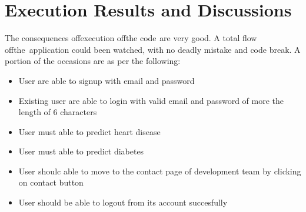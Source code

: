 \documentclass[oneside,12pt]{Classes/VTU}
\begin{document}
	\section{Execution Results and Discussions}
	The consequences of\tiny\textcolor{white}{f}\normalsize execution\tiny\textcolor{white}{f}\normalsize of\tiny\textcolor{white}{f}\normalsize the code\tiny\textcolor{white}{s}\normalsize are very good. A total flow of\tiny\textcolor{white}{f}\normalsize the\tiny\textcolor{white}{y}\normalsize application could been watched, with no deadly mistake and code break. A portion of the occasions are as per the following:
	\begin{itemize}
		\item User are able to signup with email and password
		\item Existing user are able to login with valid email and password of more the length of 6 characters
		\item User\tiny\textcolor{white}{s}\normalsize must able to predict heart disease 
		\item User\tiny\textcolor{white}{s}\normalsize must able to predict diabetes  
		\item User\tiny\textcolor{white}{s}\normalsize shoulc able to move to the contact page of development team by clicking on contact button 
		\item User should be able to logout from its account succesfully 
		
	\end{itemize}
\end{document}

